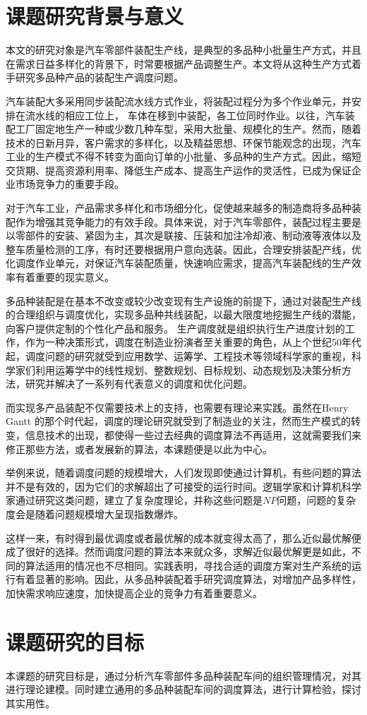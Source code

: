 \chapter{课题研究背景与意义}
本文的研究对象是汽车零部件装配生产线，是典型的多品种小批量生产方式，并且在需求日益多样化的背景下，时常要根据产品调整生产。本文将从这种生产方式着手研究多品种产品的装配生产调度问题。

汽车装配大多采用同步装配流水线方式作业，将装配过程分为多个作业单元，并安排在流水线的相应工位上，
车体在移到中装配，各工位同时作业。以往，汽车装配工厂固定地生产一种或少数几种车型，采用大批量、规模化的生产。然而，随着技术的日新月异，客户需求的多样化，以及精益思想、环保节能观念的出现，汽车工业的生产模式不得不转变为面向订单的小批量、多品种的生产方式。因此，缩短交货期、提高资源利用率、降低生产成本、提高生产运作的灵活性，已成为保证企业市场竞争力的重要手段。

对于汽车工业，产品需求多样化和市场细分化，促使越来越多的制造商将多品种装配作为增强其竞争能力的有效手段。具体来说，对于汽车零部件，装配过程主要是以零部件的安装、紧固为主，其次是联接、压装和加注冷却液、制动液等液体以及整车质量检测的工序，有时还要根据用户意向选装。因此，合理安排装配产线，优化调度作业单元，对保证汽车装配质量，快速响应需求，提高汽车装配线的生产效率有着重要的现实意义。

多品种装配是在基本不改变或较少改变现有生产设施的前提下，通过对装配生产线的合理组织与调度优化，实现多品种共线装配，以最大限度地挖掘生产线的潜能，向客户提供定制的个性化产品和服务。
生产调度就是组织执行生产进度计划的工作，作为一种决策形式，调度在制造业扮演者至关重要的角色，从上个世纪50年代起，调度问题的研究就受到应用数学、运筹学、工程技术等领域科学家的重视，科学家们利用运筹学中的线性规划、整数规划、目标规划、动态规划及决策分析方法，研究并解决了一系列有代表意义的调度和优化问题\cite{徐俊刚2004}。

而实现多产品装配不仅需要技术上的支持，也需要有理论来实践。虽然在Henry Gantt 的那个时代起，调度的理论研究就受到了制造业的关注，然而生产模式的转变，信息技术的出现，都使得一些过去经典的调度算法不再适用，这就需要我们来修正那些方法，或者发展新的算法，本课题便是以此为中心。

举例来说，随着调度问题的规模增大，人们发现即使通过计算机，有些问题的算法并不是有效的，因为它们的求解超出了可接受的运行时间。逻辑学家和计算机科学家通过研究这类问题，建立了复杂度理论，并称这些问题是$NP$问题，问题的复杂度会是随着问题规模增大呈现指数爆炸。

这样一来，有时得到最优调度或者最优解的成本就变得太高了，那么近似最优解便成了很好的选择。然而调度问题的算法本来就众多，求解近似最优解更是如此，不同的算法适用的情况也不尽相同。实践表明，寻找合适的调度方案对生产系统的运行有着显著的影响。因此，从多品种装配着手研究调度算法，对增加产品多样性，加快需求响应速度，加快提高企业的竞争力有着重要意义。

\chapter{课题研究的目标}
本课题的研究目标是，通过分析汽车零部件多品种装配车间的组织管理情况，对其进行理论建模。同时建立通用的多品种装配车间的调度算法，进行计算检验，探讨其实用性。